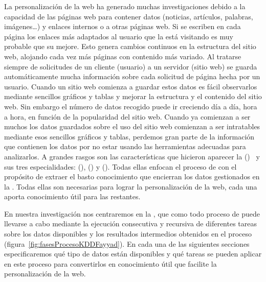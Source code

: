 La personalización de la web ha generado muchas investigaciones debido a la capacidad de las páginas web para contener datos (noticias, artículos, palabras, imágenes\ldots) y enlaces internos o a otras páginas web. Si se escriben en cada página los enlaces más adaptados al usuario que la está visitando es muy probable que su \ux mejore. Esto genera cambios continuos en la estructura del sitio web, alojando cada vez más páginas con contenido más variado. Al tratarse siempre de solicitudes de un cliente (usuario) a un servidor (sitio web) se guarda automáticamente mucha información sobre cada solicitud de página hecha por un usuario. Cuando un sitio web comienza a guardar estos datos es fácil observarlos mediante sencillos gráficos y tablas y mejorar la estructura y el contenido del sitio web. Sin embargo el número de datos recogido puede ir creciendo día a día, hora a hora, en función de la popularidad del sitio web. Cuando ya comienzan a ser muchos los datos guardados sobre el uso del sitio web comienzan a ser intratables mediante esos sencillos gráficos y tablas, perdemos gran parte de la información que contienen los datos por no estar usando las herramientas adecuadas para analizarlos. A grandes rasgos son las características que hicieron aparecer la \wm (\WM)~\citep{CooleyMobasherSrivastava-WebMining-1997,Pitkow-InSearchOfReliableUsageDataWWW-1997,KosalaBlockeel-WebMiningResearch-2000,Scime-WebMiningApplicationsAndTechniques-2004} y sus tres especialidades: \wsm (\WSM), \wcm (\WCM) y \wum (\WUM). Todas ellas enfocan el proceso de \KDD con el propósito de extraer el basto conocimiento que encierran los datos gestionados en la \WWW. Todas ellas son necesarias para lograr la personalización de la web, cada una aporta conocimiento útil para las restantes.

En nuestra investigación nos centraremos en la \wum, que como todo proceso de \KDD puede llevarse a cabo mediante la ejecución consecutiva y recursiva de diferentes tareas sobre los datos disponibles y los resultados intermedios obtenidos en el proceso (figura~\ref{fig:fasesProcesoKDDFayyad}). En cada una de las siguientes secciones especificaremos qué tipo de datos están disponibles y qué tareas se pueden aplicar en este proceso para convertirlos en conocimiento útil que facilite la personalización de la web\citep{SrivastavaCooleyDeshpandeTan-WUMDiscoveryAndApplicationsOfUsagePatterns-2000,MobasherCooleySrivastava-AutomaticPersonalizationBasedOnWUM-2000,DeBraAroyoChepegin-NextBigThingAdaptiveWebBasedSystems-2004}.
